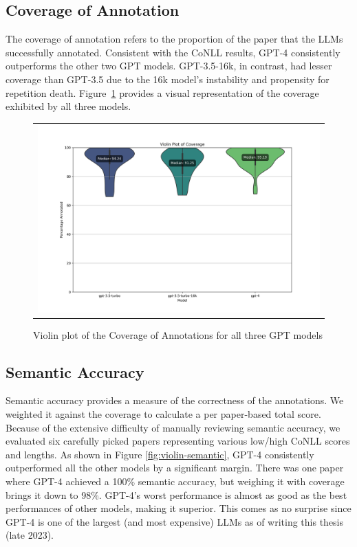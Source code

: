 \subsection{Coverage of Annotation}

The coverage of annotation refers to the proportion of the paper that the LLMs successfully annotated. Consistent with the CoNLL results, GPT-4 consistently outperforms the other two GPT models. GPT-3.5-16k, in contrast, had lesser coverage than GPT-3.5 due to the 16k model's instability and propensity for repetition death. %
Figure~\ref{fig:violin-coverage} provides a visual representation of the coverage exhibited by all three models.

\begin{figure}[htpb]
  \centering
  \begin{tabular}{c}
  \includegraphics[width=14cm]{images/coverage.png}
  \end{tabular}
  \caption[Distribution of Coverage]{Violin plot of the Coverage of Annotations for all three GPT models}\label{fig:violin-coverage}
\end{figure}
 
\subsection{Semantic Accuracy}
Semantic accuracy provides a measure of the correctness of the annotations. We weighted it against the coverage to calculate a per paper-based total score. Because of the extensive difficulty of manually reviewing semantic accuracy, we evaluated six carefully picked papers representing various low/high CoNLL scores and lengths. As shown in Figure \ref{fig:violin-semantic}, GPT-4 consistently outperformed all the other models by a significant margin. There was one paper where GPT-4 achieved a 100\% semantic accuracy, but weighing it with coverage brings it down to 98\%. GPT-4's worst performance is almost as good as the best performances of other models, making it superior. This comes as no surprise since GPT-4 is one of the largest (and most expensive) LLMs as of writing this thesis (late 2023).

